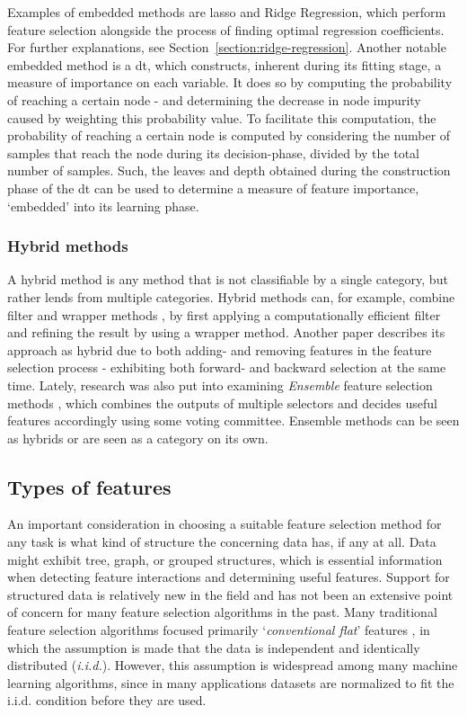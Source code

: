 \documentclass{article}
\begin{document}
Examples of embedded methods are \gls{lasso} and Ridge Regression, which perform feature selection alongside the process of finding optimal regression coefficients. For further explanations, see Section~\ref{section:ridge-regression}. Another notable embedded method is a \gls{dt}, which constructs, inherent during its fitting stage, a measure of importance on each variable. It does so by computing the probability of reaching a certain node - and determining the decrease in node impurity caused by weighting this probability value. To facilitate this computation, the probability of reaching a certain node is computed by considering the number of samples that reach the node during its decision-phase, divided by the total number of samples. Such, the leaves and depth obtained during the construction phase of the \gls{dt} can be used to determine a measure of feature importance, `embedded' into its learning phase.


\subsubsection{Hybrid methods}
A hybrid method is any method that is not classifiable by a single category, but rather lends from multiple categories. Hybrid methods can, for example, combine filter and wrapper methods \citep{hsu_hybrid_2011}, by first applying a computationally efficient filter and refining the result by using a wrapper method. Another paper \citep{das_filters_2001} describes its approach as hybrid due to both adding- and removing features in the feature selection process - exhibiting both forward- and backward selection at the same time. Lately, research was also put into examining \textit{Ensemble} feature selection methods \citep{bolon-canedo_ensembles_2019}, which combines the outputs of multiple selectors and decides useful features accordingly using some voting committee. Ensemble methods can be seen as hybrids or are seen as a category on its own.

\subsection{Types of features}
An important consideration in choosing a suitable feature selection method for any task is what kind of structure the concerning data has, if any at all. Data might exhibit tree, graph, or grouped structures, which is essential information when detecting feature interactions and determining useful features. Support for structured data is relatively new in the field and has not been an extensive point of concern for many feature selection algorithms in the past. Many traditional feature selection algorithms focused primarily `\textit{conventional flat}' features \citep{li_feature_2017}, in which the assumption is made that the data is independent and identically distributed (\textit{i.i.d.}). However, this assumption is widespread among many machine learning algorithms, since in many applications datasets are normalized to fit the i.i.d. condition before they are used.
\end{document}
